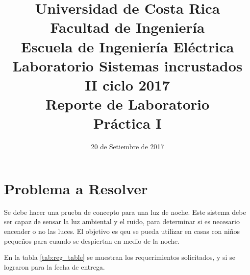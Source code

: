 

\title{Universidad de Costa Rica\\{\small Facultad de Ingeniería\\Escuela de Ingeniería Eléctrica\\
    Laboratorio Sistemas incrustados\\II ciclo 2017\\\vspace*{0.55in} Reporte de Laboratorio}\\ Práctica I \vspace*{1.1in}}
\date{20 de Setiembre de 2017}






\newpage

\section{Problema a Resolver}
Se debe hacer una prueba de concepto para una luz de noche. Este sistema debe ser capaz de sensar la
luz ambiental y el ruido, para determinar si es necesario encender o no las luces. El objetivo es
qeu se pueda utilizar en casas con niños pequeños para cuando se despiertan en medio de la noche. 


En la tabla \ref{tab:reg_table} se muestran los requerimientos solicitados, y si se lograron para la
fecha de entrega.

